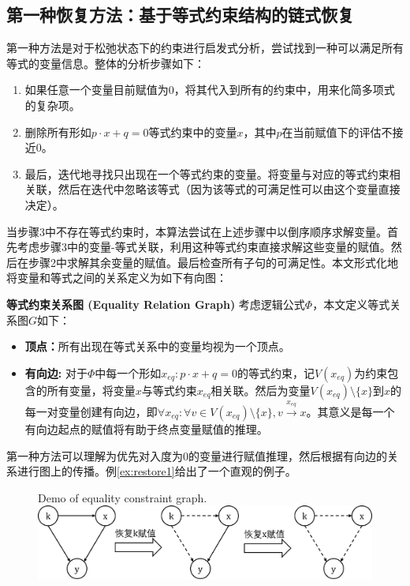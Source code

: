 \subsection{第一种恢复方法：基于等式约束结构的链式恢复}
第一种方法是对于松弛状态下的约束进行启发式分析，尝试找到一种可以满足所有等式的变量信息。整体的分析步骤如下：
\begin{enumerate}
    \item 如果任意一个变量目前赋值为0，将其代入到所有的约束中，用来化简多项式的复杂项。
    \item 删除所有形如$p \cdot x + q = 0$等式约束中的变量$x$，其中$p$在当前赋值下的评估不接近0。
    \item 最后，迭代地寻找只出现在一个等式约束的变量。将变量与对应的等式约束相关联，然后在迭代中忽略该等式（因为该等式的可满足性可以由这个变量直接决定）。
\end{enumerate}
当步骤3中不存在等式约束时，本算法尝试在上述步骤中以倒序顺序求解变量。首先考虑步骤3中的变量-等式关联，利用这种等式约束直接求解这些变量的赋值。然后在步骤2中求解其余变量的赋值。最后检查所有子句的可满足性。本文形式化地将变量和等式之间的关系定义为如下有向图：
\begin{definition}{\textbf{等式约束关系图 (Equality Relation Graph)}}
考虑逻辑公式$\Phi$，本文定义等式关系图$G$如下：
\begin{itemize}
    \item \textbf{顶点：}所有出现在等式关系中的变量均视为一个顶点。
    \item \textbf{有向边:} 对于$\Phi$中每一个形如$x_{eq}: p \cdot x + q = 0$的等式约束，记$V(x_{eq})$为约束包含的所有变量，将变量$x$与等式约束$x_{eq}$相关联。然后为变量$V(x_{eq}) \setminus \{x\}$到$x$的每一对变量创建有向边，即$\forall x_{eq}: \forall v \in V(x_{eq}) \setminus \{x\}, v \xrightarrow{x_{eq}} x$。其意义是每一个有向边起点的赋值将有助于终点变量赋值的推理。
\end{itemize}
\end{definition}

第一种方法可以理解为优先对入度为0的变量进行赋值推理，然后根据有向边的关系进行图上的传播。例\ref{ex:restore1}给出了一个直观的例子。

\begin{figure}[t]
    \centering
     {Demo of equality constraint graph.}
    \includegraphics[width=\columnwidth]{Img/restore1.png}
\label{fig:restore1}
\end{figure}


